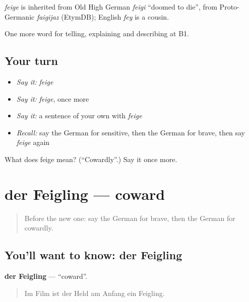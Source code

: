 \begin{cousinweb}
\emph{feige} is inherited from Old High German \emph{feigi} \textquotedblleft{}doomed to die\textquotedblright{}, from Proto-Germanic \emph{faigijaz} (EtymDB); English \emph{fey} is a cousin.
\end{cousinweb}

\begin{grammarlens}[title={What you've built}]
One more word for telling, explaining and describing at B1.
\end{grammarlens}

\subsection*{Your turn}
\begin{itemize}
\raggedright
  \item \emph{Say it:} \emph{feige}
  \item \emph{Say it:} \emph{feige}, once more
  \item \emph{Say it:} a sentence of your own with \emph{feige}
  \item \emph{Recall:} say the German for sensitive, then the German for brave, then say \emph{feige} again
\end{itemize}

\begin{tcolorbox}[breakable,colback=teal!4,colframe=teal!35!black,title={Before you move on}]
What does feige mean? (\textquotedblleft{}Cowardly\textquotedblright{}.) Say it once more.
\end{tcolorbox}
\section[der Feigling]{der Feigling — coward}

\label{lesson:GE-C477-feigling}



\begin{quote}
Before the new one: say the German for brave, then the German for cowardly.
\end{quote}

\subsection*{You'll want to know: der Feigling}
\textbf{der Feigling} — \textquotedblleft{}coward\textquotedblright{}.

\begin{quote}
Im Film ist der Held am Anfang ein Feigling.
\end{quote}

